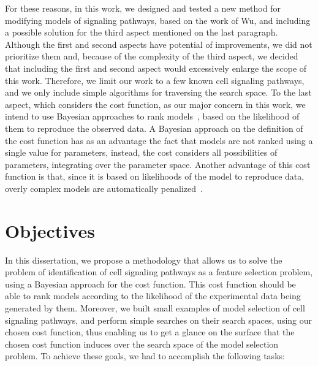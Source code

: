 For these reasons, in this work, we designed and tested a new method for 
modifying models of signaling pathways, based on the work of Wu, and 
including a possible solution for the third aspect mentioned on the last 
paragraph. Although the first and second aspects have potential of 
improvements, we did not prioritize them and, because of the 
complexity of the third aspect, we decided that including the first and 
second aspect would excessively enlarge the scope of this work.
Therefore, we limit our work to a few known cell signaling pathways, and
we only include simple algorithms for traversing the search space. To
the last aspect, which considers the cost function, as our major 
concern in this work, we intend to use Bayesian approaches to rank 
models~\cite{Vyshemirsky2007}, based on the likelihood of them to 
reproduce the observed data. A Bayesian approach on the definition of
the cost function has as an advantage the fact that models are not 
ranked using a single value for parameters, instead, the cost considers 
all possibilities of parameters, integrating over the parameter space. 
Another advantage of this cost function is that, since it is based on 
likelihoods of the model to reproduce data, overly complex models are 
automatically penalized~\cite{bishop2006pattern}.

\section{Objectives}
In this dissertation, we propose a methodology that allows us 
to solve the problem of identification of cell signaling pathways as a 
feature selection problem, using a Bayesian approach for the cost
function. This cost function should be able to rank models according to
the likelihood of the experimental data being generated by them.
Moreover, we built small examples of model selection of cell signaling
pathways, and perform simple searches on their search spaces, using our
chosen cost  function, thus enabling us to get a glance on the surface 
that the chosen cost function induces over the search space of the model
selection problem. To achieve these goals, we had to accomplish the 
following tasks:

